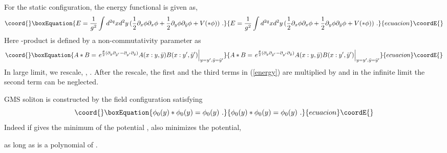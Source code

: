 \documentclass[a4paper,12pt]{article}
\begin{document}
For the static configuration, the energy functional is given as,
\begin{equation}\coord{}\boxEquation{\label{energy}
 E=\frac{1}{g^2}\int d^{2q} x  d^2 y\, 
(\frac{1}{2}\partial_x\phi\partial_x\phi +
\frac{1}{2}\partial_y\phi\partial_{\bar y}\phi + V(* \phi))\,\,.
}{E=\frac{1}{g^2}\int d^{2q} x  d^2 y\, 
(\frac{1}{2}\partial_x\phi\partial_x\phi +
\frac{1}{2}\partial_y\phi\partial_{\bar y}\phi + V(* \phi))\,\,.
}{ecuacion}\coordE{}\end{equation}
Here \myHighlight{$*$}\coordHE{}-product is defined by a non-commutativity parameter
\myHighlight{$\theta$}\coordHE{} as
\begin{equation}\coord{}\boxEquation{\label{star-product}
 A * B = \left.e^{\frac{\theta}{2}(\partial_y\partial_{\bar{y}'}-\partial_{y'}
\partial_{\bar{y}})} A(x: y,\bar y) B(x:y',\bar y')
\right|_{y=y',\bar y=\bar y'}
}{A * B = \left.e^{\frac{\theta}{2}(\partial_y\partial_{\bar{y}'}-\partial_{y'}
\partial_{\bar{y}})} A(x: y,\bar y) B(x:y',\bar y')
\right|_{y=y',\bar y=\bar y'}
}{ecuacion}\coordE{}\end{equation}
In large \myHighlight{$\theta$}\coordHE{} limit, we rescale, \coordHE{},
\coordHE{}.  After the rescale, the first and the third terms
in (\ref{energy}) are multiplied by \myHighlight{$\theta$}\coordHE{}
and in the infinite \myHighlight{$\theta$}\coordHE{} limit the second term 
can be neglected.



GMS soliton is constructed by the
field configuration satisfying
\begin{equation}\coord{}\boxEquation{\label{projection}
 \phi_0(y) * \phi_0(y) = \phi_0(y)\,\,.
}{\phi_0(y) * \phi_0(y) = \phi_0(y)\,\,.
}{ecuacion}\coordE{}\end{equation}
Indeed if \myHighlight{$\lambda_*$}\coordHE{} gives the minimum of the potential
\coordHE{}, \newline
{}\coordHE{} also minimizes the
potential,

as long as \coordHE{} is a polynomial of \myHighlight{$\lambda$}\coordHE{}.
\end{document}
